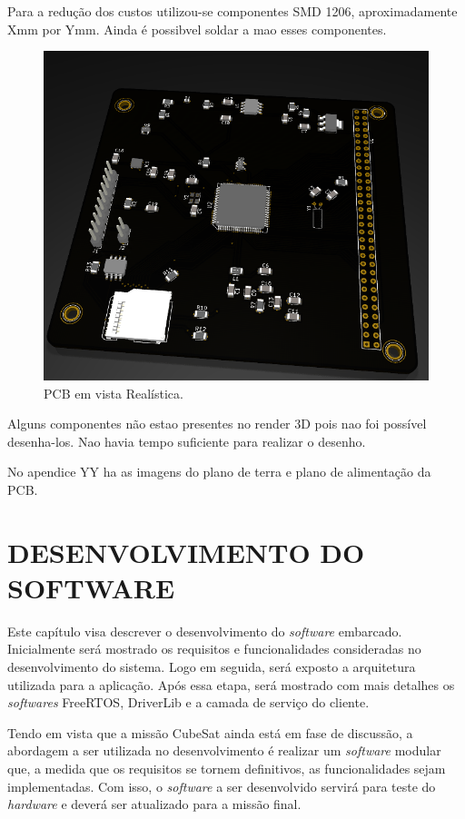 Para a redução dos custos utilizou-se componentes SMD 1206, aproximadamente Xmm por Ymm. Ainda é possibvel soldar a mao esses componentes.

\begin{figure}[h]
	\centering
	\includegraphics[keepaspectratio=true,scale=0.78]{figuras/pcbRealistic.PNG}
	\caption{PCB em vista Realística.}
	\label{arquiteturaOBC}
\end{figure}

Alguns componentes não estao presentes no render 3D pois nao foi possível desenha-los. Nao havia tempo suficiente para realizar o desenho.

No apendice YY ha as imagens do plano de terra e plano de alimentação da PCB.

\chapter[DESENVOLVIMENTO DO SOFTWARE]{DESENVOLVIMENTO DO SOFTWARE}

Este capítulo visa descrever o desenvolvimento do \textit{software} embarcado. Inicialmente será mostrado os requisitos e funcionalidades consideradas no desenvolvimento do sistema. Logo em seguida, será exposto a arquitetura utilizada para a aplicação. Após essa etapa, será mostrado com mais detalhes os \textit{softwares} FreeRTOS, DriverLib e a camada de serviço do cliente. 

Tendo em vista que a missão CubeSat ainda está em fase de discussão, a abordagem a ser utilizada no desenvolvimento é realizar um \textit{software} modular que, a medida que os requisitos se tornem definitivos, as funcionalidades sejam implementadas. Com isso, o \textit{software} a ser desenvolvido servirá para teste do \textit{hardware} e deverá ser atualizado para a missão final.

